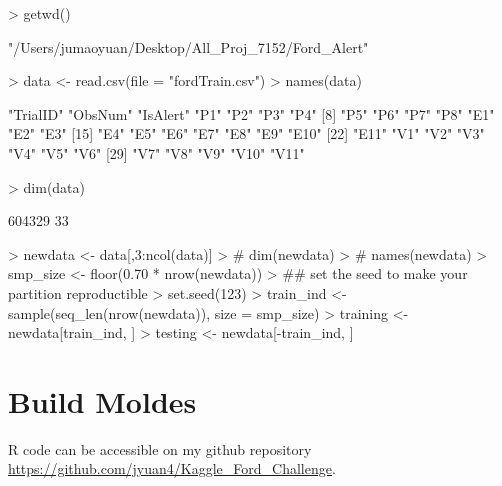 \documentclass[11pt]{article}
\begin{document}
\begin{Schunk}
\begin{Sinput}
> getwd()
\end{Sinput}
\begin{Soutput}
[1] "/Users/jumaoyuan/Desktop/All_Proj_7152/Ford_Alert"
\end{Soutput}
\begin{Sinput}
> data <- read.csv(file = "fordTrain.csv")
> names(data)
\end{Sinput}
\begin{Soutput}
 [1] "TrialID" "ObsNum"  "IsAlert" "P1"      "P2"      "P3"      "P4"     
 [8] "P5"      "P6"      "P7"      "P8"      "E1"      "E2"      "E3"     
[15] "E4"      "E5"      "E6"      "E7"      "E8"      "E9"      "E10"    
[22] "E11"     "V1"      "V2"      "V3"      "V4"      "V5"      "V6"     
[29] "V7"      "V8"      "V9"      "V10"     "V11"    
\end{Soutput}
\begin{Sinput}
> dim(data)
\end{Sinput}
\begin{Soutput}
[1] 604329     33
\end{Soutput}
\begin{Sinput}
> newdata <- data[,3:ncol(data)]
> # dim(newdata)
> # names(newdata)
> smp_size <- floor(0.70 * nrow(newdata))
> ## set the seed to make your partition reproductible
> set.seed(123)
> train_ind <- sample(seq_len(nrow(newdata)), size = smp_size)
> training <- newdata[train_ind, ]
> testing <- newdata[-train_ind, ]
\end{Sinput}
\end{Schunk}

\section{Build Moldes}
R code can be accessible on my github repository \url{https://github.com/jyuan4/Kaggle_Ford_Challenge}.

\end{document}
